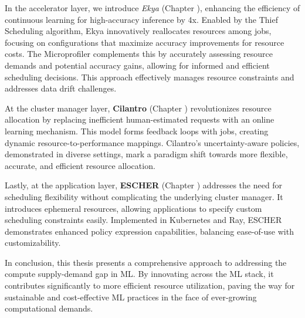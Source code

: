 In the accelerator layer, we introduce \textit{Ekya} (Chapter \fillme{}), enhancing the efficiency of continuous learning for high-accuracy inference by 4x. Enabled by the Thief Scheduling algorithm, Ekya innovatively reallocates resources among jobs, focusing on configurations that maximize accuracy improvements for resource costs. The Microprofiler complements this by accurately assessing resource demands and potential accuracy gains, allowing for informed and efficient scheduling decisions. This approach effectively manages resource constraints and addresses data drift challenges.

At the cluster manager layer, \textbf{Cilantro} (Chapter \fillme{}) revolutionizes resource allocation by replacing inefficient human-estimated requests with an online learning mechanism. This model forms feedback loops with jobs, creating dynamic resource-to-performance mappings. Cilantro's uncertainty-aware policies, demonstrated in diverse settings, mark a paradigm shift towards more flexible, accurate, and efficient resource allocation.

Lastly, at the application layer, \textbf{ESCHER} (Chapter \fillme{}) addresses the need for scheduling flexibility without complicating the underlying cluster manager. It introduces ephemeral resources, allowing applications to specify custom scheduling constraints easily. Implemented in Kubernetes and Ray, ESCHER demonstrates enhanced policy expression capabilities, balancing ease-of-use with customizability.

In conclusion, this thesis presents a comprehensive approach to addressing the compute supply-demand gap in ML. By innovating across the ML stack, it contributes significantly to more efficient resource utilization, paving the way for sustainable and cost-effective ML practices in the face of ever-growing computational demands.


